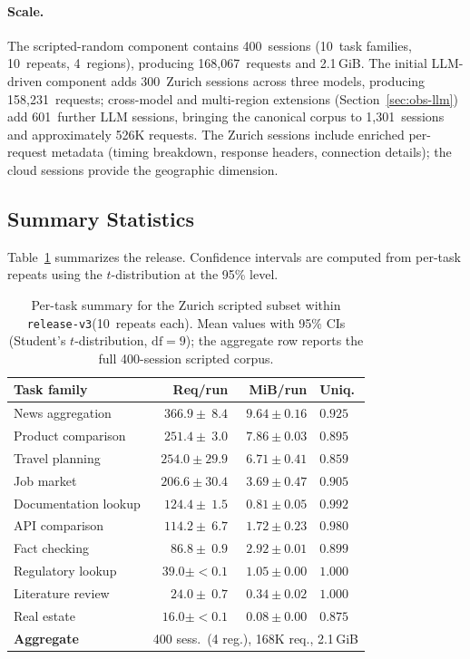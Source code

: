 \documentclass[10pt,sigconf,letterpaper,anonymous,nonacm]{acmart}
\newcommand{\release}{\texttt{release-v3}\xspace}
\begin{document}
\paragraph{Scale.}
The scripted-random component contains 400~sessions (10~task families,
10~repeats, 4~regions), producing 168{,}067~requests and 2.1\,GiB.
The initial LLM-driven component adds 300~Zurich sessions across three
models, producing 158{,}231~requests; cross-model and multi-region
extensions (Section~\ref{sec:obs-llm}) add 601~further LLM sessions,
bringing the canonical corpus to 1{,}301~sessions and approximately 526K
requests.  The Zurich sessions include enriched per-request metadata
(timing breakdown, response headers, connection details); the cloud
sessions provide the geographic dimension.

\subsection{Summary Statistics}

Table~\ref{tab:release} summarizes the release.  Confidence intervals
are computed from per-task repeats using the $t$-distribution at the
95\% level.

\begin{table}[t]
\centering
\small
\caption{Per-task summary for the Zurich scripted subset within
  \release (10~repeats each).  Mean values with 95\% CIs
  (Student's $t$-distribution, $\mathrm{df}=9$); the aggregate row
  reports the full 400-session scripted corpus.}
\label{tab:release}
\begin{tabular}{@{}lrrl@{}}
\toprule
\textbf{Task family} & \textbf{Req/run} & \textbf{MiB/run} & \textbf{Uniq.} \\
\midrule
News aggregation      & $366.9 \pm ~8.4$ & $9.64 \pm 0.16$ & $0.925$ \\
Product comparison    & $251.4 \pm ~3.0$ & $7.86 \pm 0.03$ & $0.895$ \\
Travel planning       & $254.0 \pm 29.9$ & $6.71 \pm 0.41$ & $0.859$ \\
Job market            & $206.6 \pm 30.4$ & $3.69 \pm 0.47$ & $0.905$ \\
Documentation lookup  & $124.4 \pm ~1.5$ & $0.81 \pm 0.05$ & $0.992$ \\
API comparison        & $114.2 \pm ~6.7$ & $1.72 \pm 0.23$ & $0.980$ \\
Fact checking         & $~86.8 \pm ~0.9$ & $2.92 \pm 0.01$ & $0.899$ \\
Regulatory lookup     & $~39.0 \pm <0.1$ & $1.05 \pm 0.00$ & $1.000$ \\
Literature review     & $~24.0 \pm ~0.7$ & $0.34 \pm 0.02$ & $1.000$ \\
Real estate           & $~16.0 \pm <0.1$ & $0.08 \pm 0.00$ & $0.875$ \\
\midrule
\textbf{Aggregate}    & \multicolumn{3}{l}{400 sess.\ (4 reg.), 168K req., 2.1\,GiB} \\
\bottomrule
\end{tabular}
\end{table}
\end{document}
